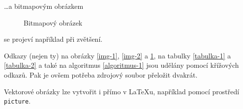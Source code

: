 \documentclass[a4paper, 11pt]{article}
\begin{document}
    \dots a bitmapovým obrázkem
    
    \begin{figure}[h]
    \centering
    \caption{Bitmapový obrázek}
    \label{img-3}
    \end{figure}
    
    \noindent se projeví například při zvětšení.
    
    Odkazy (nejen ty) na obrázky \ref{img-1}, \ref{img-2} a \ref{img-3}, na tabulky \ref{tabulka-1} a \ref{tabulka-2} a také na algoritmus \ref{algoritmus-1} jsou udělány pomocí křížových odkazů. Pak je ovšem potřeba zdrojový soubor přeložit dvakrát.
    
    Vektorové obrázky lze vytvořit i přímo v \LaTeX u, například pomocí prostředí \texttt{picture}.
    
\end{document}
